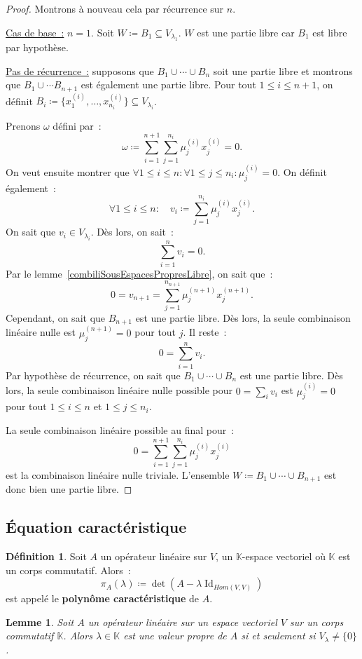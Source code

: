 \documentclass{article}
\DeclareMathOperator{\Id}{Id}
\newcommand{\K}{\mathbb K}
\newtheorem{lem}[thm]{Lemme}
\theoremstyle{definition}
\newtheorem{déf}[thm]{Définition}
\theoremstyle{remark}
\begin{document}
		\begin{proof} Montrons à nouveau cela par récurrence sur $n$.

		\underline{Cas de base~:} $n = 1$. Soit $W \coloneqq B_1 \subseteq V_{\lambda_1}$. $W$ est une partie libre car $B_1$ est libre par hypothèse.

		\underline{Pas de récurrence~:} supposons que $B_1 \cup \dotsb \cup B_n$ soit une partie libre et montrons que $B_1 \cup \dotsb B_{n+1}$ est également
		une partie libre. Pour tout $1 \leq i \leq n+1$, on définit $B_i \coloneqq \{x_1^{(i)}, \dotsc, x_{n_i}^{(i)}\} \subseteq V_{\lambda_i}$.

		Prenons $\omega$ défini par~: \[\omega \coloneqq \sum_{i=1}^{n+1}\sum_{j=1}^{n_i}\mu_j^{(i)}x_j^{(i)} = 0.\]
		On veut ensuite montrer que $\forall 1 \leq i \leq n : \forall 1 \leq j \leq n_i : \mu_j^{(i)} = 0$. On définit également~:
		\[\forall 1 \leq i \leq n : \quad v_i \coloneqq \sum_{j=1}^{n_i}\mu_j^{(i)}x_j^{(i)}.\]
		On sait que $v_i \in V_{\lambda_i}$. Dès lors, on sait~: \[\sum_{i=1}^nv_i = 0.\]
		Par le lemme~\ref{combiliSousEspacesPropresLibre}, on sait que~: \[0 = v_{n+1} = \sum_{j=1}^{n_{n+1}}\mu_j^{(n+1)}x_j^{(n+1)}.\]
		Cependant, on sait que $B_{n+1}$ est une partie libre. Dès lors, la seule combinaison linéaire nulle est $\mu_j^{(n+1)} = 0$ pour tout $j$.
		Il reste~: \[0 = \sum_{i=1}^nv_i.\] Par hypothèse de récurrence, on sait que $B_1 \cup \dotsb \cup B_n$ est une partie libre. Dès lors, la seule
		combinaison linéaire nulle possible pour $0 = \sum_iv_i$ est $\mu_j^{(i)} = 0$ pour tout $1 \leq i \leq n$ et $1 \leq j \leq n_i$.

		La seule combinaison linéaire possible au final pour~: \[0 = \sum_{i=1}^{n+1}\sum_{j=1}^{n_i}\mu_j^{(i)}x_j^{(i)}\] est la combinaison linéaire nulle
		triviale. L'ensemble $W \coloneqq B_1 \cup \dotsb \cup B_{n+1}$ est donc bien une partie libre. \end{proof}

	\subsection{Équation caractéristique}
		\begin{déf} Soit $A$ un opérateur linéaire sur $V$, un $\K$-espace vectoriel où $\K$ est un corps commutatif. Alors~:
		\[\pi_A(\lambda) \coloneqq \det(A - \lambda\Id_{Hom(V, V)})\] est appelé le \textbf{polynôme caractéristique} de $A$. \end{déf}

		\begin{lem}\label{valeurPropreiffVlambda} Soit $A$ un opérateur linéaire sur un espace vectoriel $V$ sur un corps commutatif $\K$. Alors $\lambda \in \K$
		est une valeur propre de $A$ si et seulement si $V_\lambda \neq \{0\}$. \end{lem}
\end{document}
